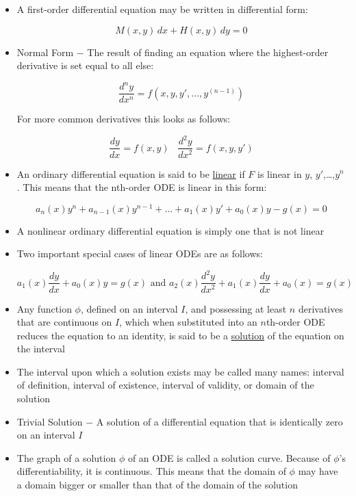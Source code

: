 \documentclass[12pt]{article}
\begin{document}
\begin{itemize}
  \item A first-order differential equation may be written in differential form:

    $$M(x,y)\,dx+H(x,y)\,dy=0$$

  \item Normal Form $-$ The result of finding an equation where the highest-order derivative is set equal to all else:

    $$\frac{d^ny}{dx^n}=f(x,y,y',\dots,y^{(n-1)})$$
    
    \begin{center} For more common derivatives this looks as follows: \end{center}

    $$\frac{dy}{dx}=f(x,y)\,\,\,\,\,\frac{d^2y}{dx^2}=f(x,y,y')$$

  \item An ordinary differential equation is said to be \underline{linear} if $F$ is linear in $y$, $y'$,\dots,$y^n$. This means that the nth-order ODE is linear in this form:

    $$a_n(x)y^n+a_{n-1}(x)y^{n-1}+\dots+a_1(x)y'+a_0(x)y-g(x)=0$$

  \item A nonlinear ordinary differential equation is simply one that is not linear

  \item Two important special cases of linear ODEs are as follows:

    $$a_1(x)\frac{dy}{dx}+a_0(x)y=g(x)\text{ and }a_2(x)\frac{d^2y}{dx^2}+a_1(x)\frac{dy}{dx}+a_0(x)=g(x)$$

  \item Any function $\phi$, defined on an interval $I$, and possessing at least $n$ derivatives that are continuous on $I$, which when substituted into an $n$th-order ODE reduces the equation to an identity, is said to be a \underline{solution} of the equation on the interval


  \item The interval upon which a solution exists may be called many names: interval of definition, interval of existence, interval of validity, or domain of the solution

  \item Trivial Solution $-$ A solution of a differential equation that is identically zero on an interval $I$

  \item The graph of a solution $\phi$ of an ODE is called a solution curve. Because of $\phi$'s differentiability, it is continuous. This means that the domain of $\phi$ may have a domain bigger or smaller than that of the domain of the solution


\end{itemize}
\end{document}
